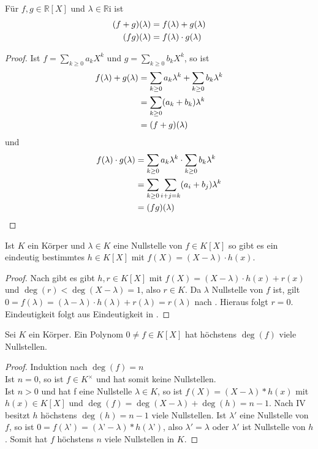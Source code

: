 \begin{lemma}
	Für $f,g \in \mathbb R[X]$ und $\lambda \in \mathbb R$i ist 
	\begin{align}
		(f+g)(\lambda)&=f(\lambda)+g(\lambda)\notag\\
		(fg)(\lambda)&=f(\lambda) \cdot g(\lambda)\notag
	\end{align}
\end{lemma}
\begin{proof}
	Ist $f=\sum _{k \ge 0} a_kX^k$ und $g=\sum _{k\ge 0} b_kX^k$, so ist \\
	\begin{align}
		f(\lambda)+g(\lambda)&=\sum _{k \ge 0} a_k\lambda^k + \sum _{k\ge 0} b_k\lambda^k \notag \\
		&= \sum _{k\ge 0} (a_k+b_k)\lambda^k\notag \\
		&=(f+g)(\lambda)\notag
	\end{align}
	und 
	\begin{align}
		f(\lambda)\cdot g(\lambda)&= \sum _{k\ge 0} a_k\lambda^k \cdot \sum _{k\ge 0} b_k\lambda^k\notag \\
		&= \sum _{k \ge 0} \sum _{i+j=k} (a_i+b_j)\lambda^k \notag \\
		&= (fg)(\lambda) \notag
	\end{align}
\end{proof}

\begin{proposition}
	Ist $K$ ein Körper und $\lambda \in K$ eine Nullstelle von $f \in K[X]$ so gibt es ein
	eindeutig bestimmtes $h \in K[X]$ mit $f(X)=(X-\lambda)\cdot h(x)$.
\end{proposition}
\begin{proof}
	Nach  gibt es gibt $h,r \in K[X]$ mit $f(X)=(X-\lambda)\cdot h(x)+r(x)$ und $\deg(r)<\deg(X-\lambda)=1$, also $r \in
	K$. Da $\lambda$ Nullstelle von $f$ ist, gilt $0=f(\lambda)=(\lambda-\lambda)\cdot h(\lambda)+r(\lambda)=
	r(\lambda)$ nach . Hieraus folgt $r=0$. Eindeutigkeit folgt aus Eindeutigkeit in .
\end{proof}

\begin{conclusion}
	Sei $K$ ein Körper. Ein Polynom $0\neq f \in K[X]$ hat höchstens $\deg(f)$ viele
	Nullstellen.
\end{conclusion}
\begin{proof}
	Induktion nach $\deg(f)=n$ \\
	Ist $n=0$, so ist $f \in K^{\times}$ und hat somit keine Nullstellen. \\
	Ist $n>0$ und hat f eine Nullstelle $\lambda \in K$, so ist $f(X)=(X-\lambda)*h(x)$ mit $h(x) \in K[X]$ und
	$\deg(f)=\deg(X-\lambda)+\deg(h)=n-1$. Nach IV besitzt $h$ höchstens $\deg(h)=n-1$ viele Nullstellen. Ist
	$\lambda'$ eine Nullstelle von $f$, so ist $0=f(\lambda’)=(\lambda’-\lambda)*h(\lambda’)$, also $\lambda'=
	\lambda$ oder $\lambda'$ ist Nullstelle von $h$. Somit hat $f$ höchstens $n$ viele Nullstellen in $K$.
\end{proof}

